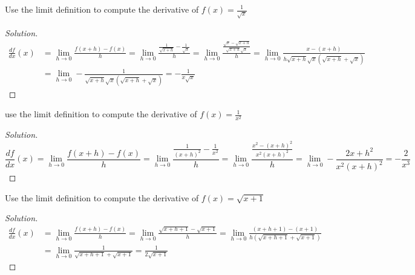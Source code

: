 \documentclass[crop=false,class=article,oneside]{standalone}
\begin{document}
            \begin{problem}
            Use the limit definition to compute the derivative of $f(x)=\frac{1}{\sqrt{x}}$
            \end{problem}
            \begin{proof}[Solution]
            \begin{align*}
                \frac{df}{dx}(x)&=\underset{h\rightarrow 0}{\lim}\frac{f(x+h)-f(x)}{h}=\underset{h\rightarrow 0}{\lim}\frac{\frac{1}{\sqrt{x+h}}-\frac{1}{\sqrt{x}}}{h}=\underset{h\rightarrow 0}{\lim}\frac{\frac{\sqrt{x}-\sqrt{x+h}}{\sqrt{x+h}\sqrt{x}}}{h}=\underset{h\rightarrow 0}{\lim}\frac{x-(x+h)}{h\sqrt{x+h}\sqrt{x}(\sqrt{x+h}+\sqrt{x})}\\
                &=\underset{h\rightarrow 0}{\lim}-\frac{1}{\sqrt{x+h}\sqrt{x}(\sqrt{x+h}+\sqrt{x})}=-\frac{1}{x\sqrt{x}}
            \end{align*}
            \end{proof}
            \begin{problem}
            use the limit definition to compute the derivative of $f(x)=\frac{1}{x^{2}}$
            \end{problem}
            \begin{proof}[Solution]
            \begin{equation*}
                \frac{df}{dx}(x)=\underset{h\rightarrow 0}{\lim}\frac{f(x+h)-f(x)}{h}=\underset{h\rightarrow 0}{\lim}\frac{\frac{1}{(x+h)^{2}}-\frac{1}{x^{2}}}{h}=\underset{h\rightarrow 0}{\lim}\frac{\frac{x^{2}-(x+h)^{2}}{x^{2}(x+h)^{2}}}{h}=\underset{h\rightarrow 0}{\lim}-\frac{2x+h^{2}}{x^{2}(x+h)^{2}}=-\frac{2}{x^{3}}
            \end{equation*}
            \end{proof}
            \begin{problem}
            Use the limit definition to compute the derivative of $f(x)=\sqrt{x+1}$
            \end{problem}
            \begin{proof}[Solution]
            \begin{align*}
                \frac{df}{dx}(x)&=\underset{h\rightarrow 0}{\lim}\frac{f(x+h)-f(x)}{h}=\underset{h\rightarrow 0}{\lim}\frac{\sqrt{x+h+1}-\sqrt{x+1}}{h}=\underset{h\rightarrow 0}{\lim}\frac{(x+h+1)-(x+1)}{h(\sqrt{x+h+1}+\sqrt{x+1})}\\
                &=\underset{h\rightarrow 0}{\lim}\frac{1}{\sqrt{x+h+1}+\sqrt{x+1}}=\frac{1}{2\sqrt{x+1}}
            \end{align*}
            \end{proof}
\end{document}
